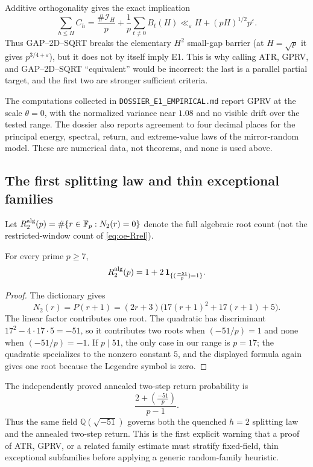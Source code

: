 Additive orthogonality gives the exact implication
\[
 \sum_{h\le H}C_h
 =\frac{\#\mathcal I_H}{p}
 +\frac1p\sum_{t\ne0}B_t(H)
 \ll_\varepsilon H+(pH)^{1/2}p^\varepsilon.
\]
Thus GAP--2D--SQRT breaks the elementary $H^2$ small-gap barrier (at
$H=\sqrt p$ it gives $p^{3/4+\varepsilon}$), but it does not by itself imply
E1.  This is why calling ATR, GPRV, and GAP--2D--SQRT ``equivalent'' would be
incorrect: the last is a parallel partial target, and the first two are
stronger sufficient criteria.

\begin{remark}\label{rem:oe-empirical-status}
The computations collected in \texttt{DOSSIER\_E1\_EMPIRICAL.md} report
GPRV at the scale $\theta=0$, with the normalized variance near $1.08$ and
no visible drift over the tested range.  The dossier also reports agreement
to four decimal places for the principal energy, spectral, return, and
extreme-value laws of the mirror-random model.  These are numerical data,
not theorems, and none is used above.
\end{remark}

\subsection{The first splitting law and thin exceptional families}

Let
$R_2^{\rm alg}(p)=\#\{r\in\mathbb F_p:N_2(r)=0\}$ denote the full algebraic
root count (not the restricted-window count of
\eqref{eq:oe-Rrel}).

\begin{proposition}[the $h=2$ splitting law]\label{prop:oe-minus51}
For every prime $p\ge7$,
\begin{equation}\label{eq:oe-minus51}
 R_2^{\rm alg}(p)
 =1+2\,\mathbf 1_{\{(\frac{-51}{p})=1\}}.
\end{equation}
\end{proposition}

\begin{proof}
The dictionary gives
\[
 N_2(r)=P(r+1)
 =(2r+3)\bigl(17(r+1)^2+17(r+1)+5\bigr).
\]
The linear factor contributes one root.  The quadratic has discriminant
$17^2-4\cdot17\cdot5=-51$, so it contributes two roots when
$(-51/p)=1$ and none when $(-51/p)=-1$.  If $p\mid51$, the only case in
our range is $p=17$; the quadratic specializes to the nonzero constant $5$,
and the displayed formula again gives one root because the Legendre symbol
is zero.
\end{proof}

\begin{remark}
\label{rem:oe-minus51-annealed}
The independently proved annealed two-step return probability is
\[
 \frac{2+(\frac{-51}{p})}{p-1}.
\]
Thus the same field $\mathbb Q(\sqrt{-51})$ governs both the quenched
$h=2$ splitting law and the annealed two-step return.  This is the first
explicit warning that a proof of ATR, GPRV, or a related family estimate
must stratify fixed-field, thin exceptional subfamilies before applying a
generic random-family heuristic.
\end{remark}
